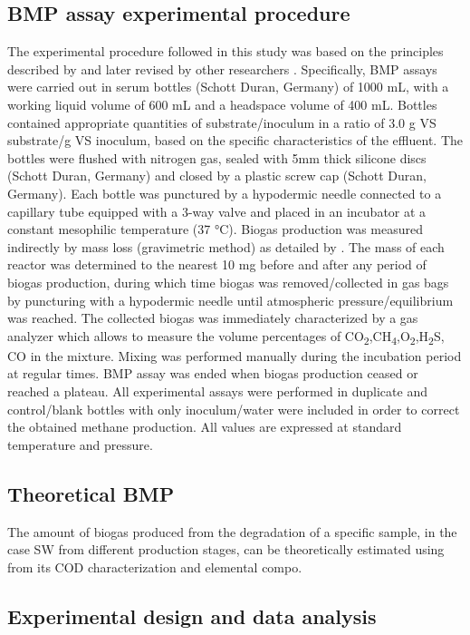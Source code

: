 \subsection{BMP assay experimental procedure}
The experimental procedure followed in this study was based on the principles described by \cite{Owen_1979} and later revised by other researchers \cite{Angelidaki_2009,Holliger_2016}. Specifically, BMP assays were carried out in serum bottles (Schott Duran, Germany) of 1000 mL, with a working liquid volume of 600 mL and a headspace volume of 400 mL. Bottles contained appropriate quantities of substrate/inoculum in a ratio of 3.0 g VS substrate/g VS inoculum, based on the specific characteristics of the effluent. The bottles were flushed with nitrogen gas, sealed with 5mm thick silicone discs (Schott Duran, Germany) and closed by a plastic screw cap (Schott Duran, Germany). Each bottle was punctured by a hypodermic needle connected to a capillary tube equipped with a 3-way valve and placed in an incubator at a constant mesophilic temperature (37 °C). Biogas production was measured indirectly by mass loss (gravimetric method) as detailed by \cite{Hafner_2015}. The mass of each reactor was determined to the nearest 10 mg before and after any period of biogas production, during which time biogas was removed/collected in gas bags by puncturing with a hypodermic needle until atmospheric pressure/equilibrium was reached. The collected biogas was immediately characterized by a gas analyzer which allows to measure the volume percentages of CO\textsubscript{2},CH\textsubscript{4},O\textsubscript{2},H\textsubscript{2}S, CO in the mixture. Mixing was performed manually during the incubation period at regular times. BMP assay was ended when biogas production ceased or reached a plateau. All experimental assays were performed in duplicate and control/blank bottles with only inoculum/water were included in order to correct the obtained methane production.  All values are expressed at standard temperature and pressure.
\subsection{Theoretical BMP}
The amount of biogas produced from the degradation of a specific sample, in the case SW from different production stages, can be theoretically estimated using from its COD characterization and elemental compo.


\subsection{Experimental design and data analysis}


